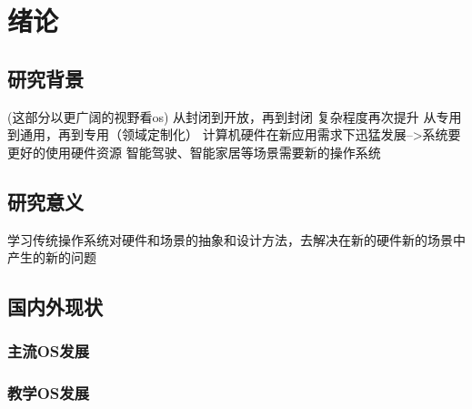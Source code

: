 \chapter{绪论}

\section{研究背景}
(这部分以更广阔的视野看os)
从封闭到开放，再到封闭
复杂程度再次提升
从专用到通用，再到专用（领域定制化）
计算机硬件在新应用需求下迅猛发展-->系统要更好的使用硬件资源
智能驾驶、智能家居等场景需要新的操作系统

\section{研究意义}
学习传统操作系统对硬件和场景的抽象和设计方法，去解决在新的硬件新的场景中产生的新的问题

\section{国内外现状}

\subsection{主流OS发展}

\subsection{教学OS发展}



